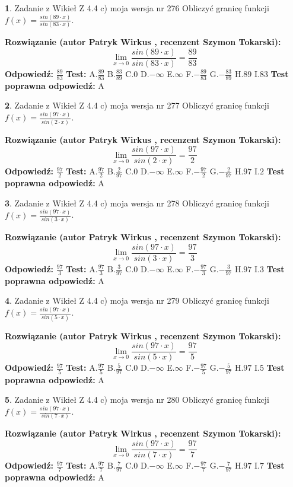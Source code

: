\documentclass[12pt, a4paper]{article}
\theoremstyle{definition} %
\newtheorem{zad}{}
\newcommand{\zadStart}[1]{\begin{zad}#1\newline}
\newcommand{\zadStop}{\end{zad}}
\newcommand{\rozwStart}[2]{\noindent \textbf{Rozwiązanie (autor #1 , recenzent #2): }\newline}
\newcommand{\rozwStop}{\newline}
\newcommand{\odpStart}{\noindent \textbf{Odpowiedź:}\newline}
\newcommand{\odpStop}{\newline}
\newcommand{\testStart}{\noindent \textbf{Test:}\newline}
\newcommand{\testStop}{\newline}
\newcommand{\kluczStart}{\noindent \textbf{Test poprawna odpowiedź:}\newline}
\newcommand{\kluczStop}{\newline}
\begin{document}
\zadStart{Zadanie z Wikieł Z 4.4 c) moja wersja nr 276}
Obliczyć granicę funkcji $f(x)=\frac{sin(89\cdot x)}{sin(83\cdot x)}$.
\zadStop
\rozwStart{Patryk Wirkus}{Szymon Tokarski}
$$\lim\limits_{x\to 0}\frac{sin(89\cdot x)}{sin(83\cdot x)}=
\frac{89}{83}$$
\rozwStop
\odpStart
$\frac{89}{83}$
\odpStop
\testStart
A.$\frac{89}{83}$
B.$\frac{83}{89}$
C.$0$
D.$-\infty$
E.$\infty$
F.$-\frac{89}{83}$
G.$-\frac{83}{89}$
H.$89$
I.$83$
\testStop
\kluczStart
A
\kluczStop



\zadStart{Zadanie z Wikieł Z 4.4 c) moja wersja nr 277}
Obliczyć granicę funkcji $f(x)=\frac{sin(97\cdot x)}{sin(2\cdot x)}$.
\zadStop
\rozwStart{Patryk Wirkus}{Szymon Tokarski}
$$\lim\limits_{x\to 0}\frac{sin(97\cdot x)}{sin(2\cdot x)}=
\frac{97}{2}$$
\rozwStop
\odpStart
$\frac{97}{2}$
\odpStop
\testStart
A.$\frac{97}{2}$
B.$\frac{2}{97}$
C.$0$
D.$-\infty$
E.$\infty$
F.$-\frac{97}{2}$
G.$-\frac{2}{97}$
H.$97$
I.$2$
\testStop
\kluczStart
A
\kluczStop



\zadStart{Zadanie z Wikieł Z 4.4 c) moja wersja nr 278}
Obliczyć granicę funkcji $f(x)=\frac{sin(97\cdot x)}{sin(3\cdot x)}$.
\zadStop
\rozwStart{Patryk Wirkus}{Szymon Tokarski}
$$\lim\limits_{x\to 0}\frac{sin(97\cdot x)}{sin(3\cdot x)}=
\frac{97}{3}$$
\rozwStop
\odpStart
$\frac{97}{3}$
\odpStop
\testStart
A.$\frac{97}{3}$
B.$\frac{3}{97}$
C.$0$
D.$-\infty$
E.$\infty$
F.$-\frac{97}{3}$
G.$-\frac{3}{97}$
H.$97$
I.$3$
\testStop
\kluczStart
A
\kluczStop



\zadStart{Zadanie z Wikieł Z 4.4 c) moja wersja nr 279}
Obliczyć granicę funkcji $f(x)=\frac{sin(97\cdot x)}{sin(5\cdot x)}$.
\zadStop
\rozwStart{Patryk Wirkus}{Szymon Tokarski}
$$\lim\limits_{x\to 0}\frac{sin(97\cdot x)}{sin(5\cdot x)}=
\frac{97}{5}$$
\rozwStop
\odpStart
$\frac{97}{5}$
\odpStop
\testStart
A.$\frac{97}{5}$
B.$\frac{5}{97}$
C.$0$
D.$-\infty$
E.$\infty$
F.$-\frac{97}{5}$
G.$-\frac{5}{97}$
H.$97$
I.$5$
\testStop
\kluczStart
A
\kluczStop



\zadStart{Zadanie z Wikieł Z 4.4 c) moja wersja nr 280}
Obliczyć granicę funkcji $f(x)=\frac{sin(97\cdot x)}{sin(7\cdot x)}$.
\zadStop
\rozwStart{Patryk Wirkus}{Szymon Tokarski}
$$\lim\limits_{x\to 0}\frac{sin(97\cdot x)}{sin(7\cdot x)}=
\frac{97}{7}$$
\rozwStop
\odpStart
$\frac{97}{7}$
\odpStop
\testStart
A.$\frac{97}{7}$
B.$\frac{7}{97}$
C.$0$
D.$-\infty$
E.$\infty$
F.$-\frac{97}{7}$
G.$-\frac{7}{97}$
H.$97$
I.$7$
\testStop
\kluczStart
A
\kluczStop
\end{document}
